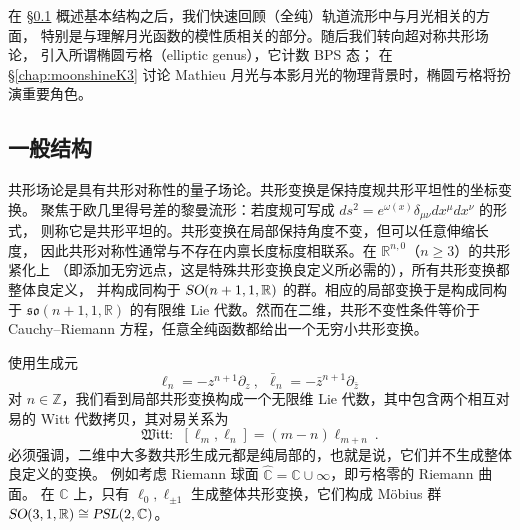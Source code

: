\documentclass[11pt,a4paper,fontset=windows]{ctexart}
\numberwithin{equation}{section}
\newcommand{\PSL}{\operatorname{\textsl{PSL}}}    %
\newcommand{\SO}{\operatorname{\textsl{SO}}}      %
\newcommand{\CC}{\mathbb{C}}
\newcommand{\RR}{\mathbb{R}}
\newcommand{\ZZ}{\mathbb{Z}}
\newcommand{\RS}{\widehat{\CC}}
\newcommand{\witt}{\mathfrak{Witt}}
\begin{document}
在 \S\ref{subsec:CFTGeneral structure} 概述基本结构之后，我们快速回顾（全纯）轨道流形中与月光相关的方面，
特别是与理解月光函数的模性质相关的部分。随后我们转向超对称共形场论，
引入所谓椭圆亏格（elliptic genus），它计数 BPS 态；
在 \S\ref{chap:moonshineK3} 讨论 Mathieu 月光与本影月光的物理背景时，椭圆亏格将扮演重要角色。

\subsection{一般结构}
\label{subsec:CFTGeneral structure}

共形场论是具有共形对称性的量子场论。共形变换是保持度规共形平坦性的坐标变换。
聚焦于欧几里得号差的黎曼流形：若度规可写成 $ds^2=e^{\omega(x)}\delta_{\mu\nu}dx^\mu dx^\nu$ 的形式，
则称它是共形平坦的。共形变换在局部保持角度不变，但可以任意伸缩长度，
因此共形对称性通常与不存在内禀长度标度相联系。在 $\RR^{n,0}$（$n\geq3$）的共形紧化上
（即添加无穷远点，这是特殊共形变换良定义所必需的），所有共形变换都整体良定义，
并构成同构于 $\SO(n+1,1,\RR)$ 的群。相应的局部变换于是构成同构于
$\mathfrak{so}(n+1,1,\RR)$ 的有限维 Lie 代数。然而在二维，共形不变性条件等价于
Cauchy–Riemann 方程，任意全纯函数都给出一个无穷小共形变换。


使用生成元
\begin{equation}
\label{eq:conf_gen}
\ell_n=-z^{n+1}\partial_z~,~~\bar{\ell}_n=-\bar{z}^{n+1}\partial_{\bar{z}}~
\end{equation}
对 $n\in\ZZ$，我们看到局部共形变换构成一个无限维 Lie 代数，其中包含两个相互对易的
Witt 代数拷贝，其对易关系为
\begin{equation}
\label{eq:witt}
\witt:~~[\ell_m,\ell_n]=(m-n)\ell_{m+n}~.
\end{equation}
必须强调，二维中大多数共形生成元都是纯局部的，也就是说，它们并不生成整体良定义的变换。
例如考虑 Riemann 球面 $\RS=\CC\cup\infty$，即亏格零的 Riemann 曲面。
在 $\RS$ 上，只有 $\ell_{0},\ell_{\pm1}$ 生成整体共形变换，它们构成 M\"obius 群
$\SO(3,1,\RR)\cong\PSL(2,\CC)$。

\end{document}
